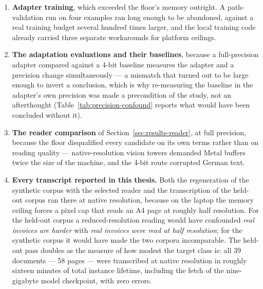 \begin{enumerate}
  \item \textbf{Adapter training}, which exceeded the floor's memory outright. A
        path-validation run on four examples ran long enough to be abandoned, against a real
        training budget several hundred times larger, and the local training code already
        carried three separate workarounds for platform ceilings.
  \item \textbf{The adaptation evaluations and their baselines}, because a full-precision
        adapter compared against a 4-bit baseline measures the adapter and a precision change
        simultaneously --- a mismatch that turned out to be large enough to invert a
        conclusion, which is why re-measuring the baseline in the adapter's own precision was
        made a precondition of the study, not an afterthought
        (Table~\ref{tab:precision-confound} reports what would have been concluded without it).
  \item \textbf{The reader comparison} of Section~\ref{sec:results-reader}, at full precision,
        because the floor disqualified every candidate on its own terms rather than on reading
        quality --- native-resolution vision towers demanded Metal buffers twice the size of
        the machine, and the 4-bit route corrupted German text.
  \item \textbf{Every transcript reported in this thesis.} Both the regeneration of the
        synthetic corpus with the selected reader and the transcription of the held-out
        corpus ran there at native resolution, because on the laptop the memory ceiling
        forces a pixel cap that reads an A4 page at roughly half resolution. For the
        held-out corpus a reduced-resolution reading would have confounded \emph{real
        invoices are harder} with \emph{real invoices were read at half resolution}; for
        the synthetic corpus it would have made the two corpora incomparable. The held-out
        pass doubles as the measure of how modest the target class is: all 39 documents ---
        58 pages --- were transcribed at native resolution in roughly sixteen minutes of
        total instance lifetime, including the fetch of the nine-gigabyte model checkpoint,
        with zero errors.
\end{enumerate}


